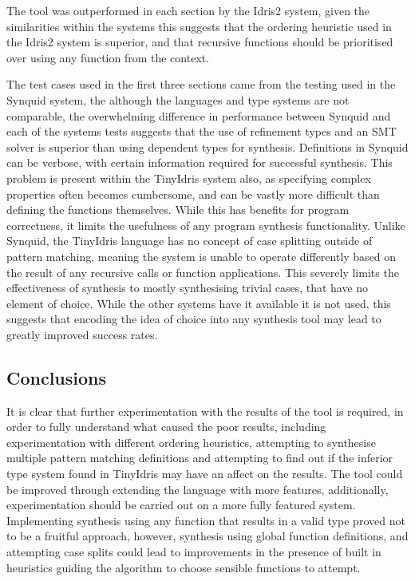 \documentclass[a4paper]{article}
\begin{document}
The tool was outperformed in each section by the Idris2 system,
given the similarities within the systems this suggests that the
ordering heuristic used in the Idris2 system is superior, and that
recursive functions should be prioritised over using any function
from the context.

The test cases used in the first three sections came from the testing
used in the Synquid system, the although the languages and type systems
are not comparable, the overwhelming difference in performance between
Synquid and each of the systems tests suggests that the use of
refinement types and an SMT solver is superior than using dependent
types for synthesis. Definitions in Synquid can be verbose, with
certain information required for successful synthesis. This problem is
present within the TinyIdris system also, as specifying complex
properties often becomes cumbersome, and can be vastly more difficult
than defining the functions themselves. While this has benefits for
program correctness, it limits the usefulness of any program synthesis
functionality. Unlike Synquid, the TinyIdris language has no concept of
case splitting outside of pattern matching,
meaning the system is unable to operate differently based on the result
of any recursive calls or function applications. This severely limits
the effectiveness of synthesis to mostly synthesising trivial cases,
that have no element of choice. While the other systems have it
available it is not used, this suggests that encoding the idea of
choice into any synthesis tool may lead to greatly improved success
rates.


\subsection{Conclusions}
It is clear that further experimentation with the results of the
tool is required, in order to fully understand what caused the poor
results, including experimentation with different ordering heuristics,
attempting to synthesise multiple pattern matching definitions and
attempting to find out if the inferior type system found in TinyIdris
may have an affect on the results. The tool could be improved through
extending the language with more features, additionally,
experimentation should be carried out on a more fully featured system.
Implementing synthesis using any function that results in a valid type
proved not to be a fruitful approach, however, synthesis using
global function definitions, and attempting case splits could lead to
improvements in the presence of built in heuristics guiding the
algorithm to choose sensible functions to attempt.
\nocite{*}
  
\clearpage
\end{document}
